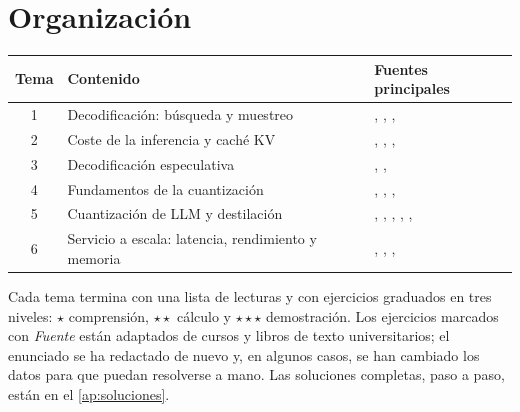 \documentclass[11pt,a4paper,twoside,openany]{book}
\begin{document}
\section*{Organización}
\begin{center}\small
\begin{tabular}{@{}cll@{}}
\toprule
Tema & Contenido & Fuentes principales \\
\midrule
1 & Decodificación: búsqueda y muestreo & \cite{jm3}, \cite{d2l}, \cite{holtzman}, \cite{fan} \\
2 & Coste de la inferencia y caché KV & \cite{cs336}, \cite{pope}, \cite{kwon}, \cite{shazeer} \\
3 & Decodificación especulativa & \cite{leviathan}, \cite{chen}, \cite{cs336} \\
4 & Fundamentos de la cuantización & \cite{grayneuhoff}, \cite{jacob}, \cite{mit65940}, \cite{smoothquant} \\
5 & Cuantización de LLM y destilación & \cite{llmint8}, \cite{smoothquant}, \cite{gptq}, \cite{awq}, \cite{qlora}, \cite{hinton} \\
6 & Servicio a escala: latencia, rendimiento y memoria & \cite{cs336}, \cite{orca}, \cite{kwon}, \cite{pope} \\
\bottomrule
\end{tabular}
\end{center}

Cada tema termina con una lista de lecturas y con ejercicios graduados en tres niveles: $\star$ comprensión, $\star\star$ cálculo y $\star\star\star$ demostración. Los ejercicios marcados con \emph{Fuente} están adaptados de cursos y libros de texto universitarios; el enunciado se ha redactado de nuevo y, en algunos casos, se han cambiado los datos para que puedan resolverse a mano. Las soluciones completas, paso a paso, están en el \cref{ap:soluciones}.
\end{document}
